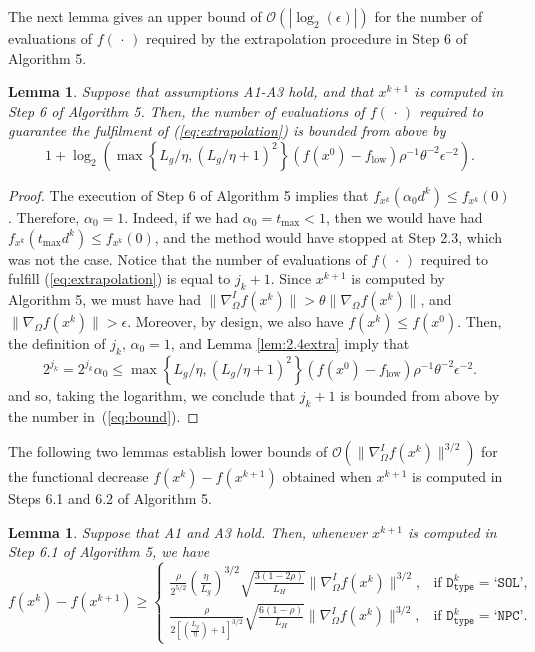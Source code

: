 \documentclass[11pt]{article}
\newtheorem{lemma}[theorem]{Lemma}
\begin{document}
The next lemma gives an upper bound of $\mathcal{O}\left(|\log_{2}(\epsilon)|\right)$ for the number of evaluations of $f(\,\cdot\,)$ required by the extrapolation procedure in Step 6 of Algorithm 5.

\begin{lemma}
\label{lem:2.6extra}
Suppose that assumptions A1-A3 hold, and that $x^{k+1}$ is computed in Step 6 of Algorithm 5. Then, the number of evaluations of $f(\,\cdot\,)$ required to guarantee the fulfilment of (\ref{eq:extrapolation}) is bounded from above by
\begin{equation}
1+\log_{2}\left(\max\left\{L_{g}/\eta,\left(L_{g}/\eta+1\right)^{2}\right\}(f(x^{0})-f_{\mathrm{low}})\rho^{-1}\theta^{-2}\epsilon^{-2}\right).
\label{eq:bound}
\end{equation}
\end{lemma}

\begin{proof}
The execution of Step 6 of Algorithm 5 implies that $f_{x^{k}}(\alpha_{0}d^{k})\leq f_{x^{k}}(0)$. Therefore, $\alpha_{0}=1$. Indeed, if we had $\alpha_{0}=t_{\max}<1$, then we would have had $f_{x^{k}}(t_{\max}d^{k})\leq f_{x^{k}}(0)$, and the method would have stopped at Step 2.3, which was not the case. Notice that the number of evaluations of $f(\,\cdot\,)$ required to fulfill (\ref{eq:extrapolation}) is equal to $j_{k}+1$. Since $x^{k+1}$ is computed by Algorithm 5, we must have had $\|\nabla_{\Omega}^{I}f(x^{k})\|>\theta\|\nabla_{\Omega} f(x^{k})\|$, and $\|\nabla_{\Omega} f(x^{k})\|>\epsilon$. Moreover, by design, we also have $f(x^{k})\leq f(x^{0})$. Then, the definition of $j_{k}$, $\alpha_{0}=1$, and Lemma \ref{lem:2.4extra} imply that
\[
2^{j_{k}}=2^{j_{k}}\alpha_{0}\leq \max\left\{L_{g}/\eta,\left(L_{g}/\eta+1\right)^{2}\right\}(f(x^{0})-f_{\mathrm{low}})\rho^{-1}\theta^{-2}\epsilon^{-2}.
\]
and so, taking the logarithm, we conclude that $j_{k}+1$ is bounded from above by the number in~(\ref{eq:bound}).
\end{proof}

The following two lemmas establish lower bounds of $\mathcal{O}\left(\|\nabla_{\Omega}^{I}f(x^{k})\|^{3/2}\right)$ for the functional decrease $f(x^{k})-f(x^{k+1})$ obtained when $x^{k+1}$ is computed in Steps 6.1 and 6.2 of Algorithm 5.

\begin{lemma}
Suppose that A1 and A3 hold. Then, whenever $x^{k+1}$ is computed in Step 6.1 of Algorithm 5, we have
\[
f(x^{k})-f(x^{k+1})\geq\left\{\begin{array}{ll}
\frac{\rho}{2^{5/2}}\left(\frac{\eta}{L_{g}}\right)^{3/2}\sqrt{\frac{3(1-2\rho)}{L_{H}}}\|\nabla_{\Omega}^{I}f(x^{k})\|^{3/2},&\text{if $\texttt{D}_{\texttt{type}}^{k}=\texttt{`SOL'}$,}\\
\frac{\rho}{2\left[\left(\frac{L_{g}}{\eta}\right)+1\right]^{3/2}}\sqrt{\frac{6(1-\rho)}{L_{H}}}\|\nabla_{\Omega}^{I}f(x^{k})\|^{3/2},&\text{if $\texttt{D}_{\texttt{type}}^{k}=\texttt{`NPC'}$.}
\end{array}
\right.
\]
\end{lemma}
\end{document}
